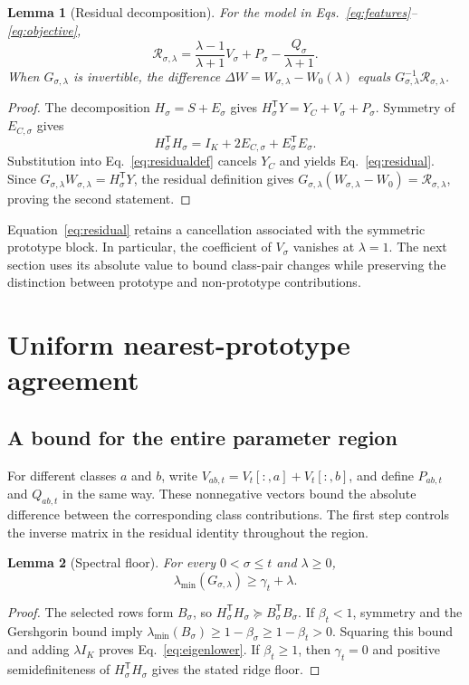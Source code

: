 \documentclass[preprint,12pt]{elsarticle}
\newtheorem{lemma}{Lemma}
\newcommand{\tr}{\mathsf{T}}
\begin{document}
\begin{lemma}[Residual decomposition]
For the model in Eqs.~\eqref{eq:features}--\eqref{eq:objective},
\begin{equation}
 \mathcal R_{\sigma,\lambda}
 =\frac{\lambda-1}{\lambda+1}V_\sigma
   +P_\sigma-\frac{Q_\sigma}{\lambda+1}.
 \label{eq:residual}
\end{equation}
When $G_{\sigma,\lambda}$ is invertible, the difference $\Delta W=W_{\sigma,\lambda}-W_0(\lambda)$ equals $G_{\sigma,\lambda}^{-1}\mathcal R_{\sigma,\lambda}$.
\end{lemma}
\begin{proof}
The decomposition $H_\sigma=S+E_\sigma$ gives $H_\sigma^\tr Y=Y_C+V_\sigma+P_\sigma$. Symmetry of $E_{C,\sigma}$ gives
\[
 H_\sigma^\tr H_\sigma
 =I_K+2E_{C,\sigma}+E_\sigma^\tr E_\sigma.
\]
Substitution into Eq.~\eqref{eq:residualdef} cancels $Y_C$ and yields Eq.~\eqref{eq:residual}. Since $G_{\sigma,\lambda}W_{\sigma,\lambda}=H_\sigma^\tr Y$, the residual definition gives $G_{\sigma,\lambda}(W_{\sigma,\lambda}-W_0)=\mathcal R_{\sigma,\lambda}$, proving the second statement.
\end{proof}

Equation~\eqref{eq:residual} retains a cancellation associated with the symmetric prototype block. In particular, the coefficient of $V_\sigma$ vanishes at $\lambda=1$. The next section uses its absolute value to bound class-pair changes while preserving the distinction between prototype and non-prototype contributions.

\section{Uniform nearest-prototype agreement}
\subsection{A bound for the entire parameter region}
For different classes $a$ and $b$, write $V_{ab,t}=V_t[:,a]+V_t[:,b]$, and define $P_{ab,t}$ and $Q_{ab,t}$ in the same way. These nonnegative vectors bound the absolute difference between the corresponding class contributions. The first step controls the inverse matrix in the residual identity throughout the region.

\begin{lemma}[Spectral floor]
For every $0<\sigma\leq t$ and $\lambda\geq0$,
\begin{equation}
 \lambda_{\min}(G_{\sigma,\lambda})\geq\gamma_t+\lambda.
 \label{eq:eigenlower}
\end{equation}
\end{lemma}
\begin{proof}
The selected rows form $B_\sigma$, so $H_\sigma^\tr H_\sigma\succeq B_\sigma^\tr B_\sigma$. If $\beta_t<1$, symmetry and the Gershgorin bound imply $\lambda_{\min}(B_\sigma)\geq1-\beta_\sigma\geq1-\beta_t>0$. Squaring this bound and adding $\lambda I_K$ proves Eq.~\eqref{eq:eigenlower}. If $\beta_t\geq1$, then $\gamma_t=0$ and positive semidefiniteness of $H_\sigma^\tr H_\sigma$ gives the stated ridge floor.
\end{proof}
\end{document}
